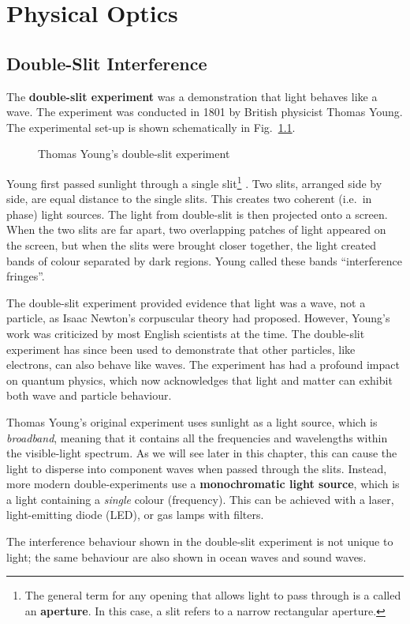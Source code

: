 %
%
\chapter{Physical Optics}
%
%

\section{Double-Slit Interference}

The \textbf{double-slit experiment} was a demonstration that light behaves like
a wave. The experiment was conducted in 1801 by British physicist Thomas Young.
The experimental set-up is shown schematically in
Fig.~\ref{fig:double-slit-setup}.
\begin{figure}[ht]
  \centering
  \caption{Thomas Young's double-slit experiment}
  \label{fig:double-slit-setup}
\end{figure}
Young first passed sunlight through a single slit\footnote{The general term
for any opening that allows light to pass through is a called an
\textbf{aperture}. In this case, a slit refers to a narrow rectangular
aperture.} . Two slits, arranged side by side, are equal distance to the single
slits. This creates two coherent (i.e.\ in phase) light sources. The light from
double-slit is then projected onto a screen. When the two slits are far apart,
two overlapping patches of light appeared on the screen, but when the slits
were brought closer together, the light created bands of colour separated by
dark regions. Young called these bands ``interference fringes''.

The double-slit experiment provided evidence that light was a wave, not a
particle, as Isaac Newton's corpuscular theory had proposed. However, Young's
work was criticized by most English scientists at the time.  The double-slit
experiment has since been used to demonstrate that other particles, like
electrons, can also behave like waves. The experiment has had a profound impact
on quantum physics, which now acknowledges that light and matter can exhibit
both wave and particle behaviour.
\begin{remark}
  Thomas Young's original experiment uses sunlight as a light source, which is
  \emph{broadband}, meaning that it contains all the frequencies and
  wavelengths within the visible-light spectrum. As we will see later in this
  chapter, this can cause the light to disperse into component waves when passed
  through the slits. Instead, more modern double-experiments use a
  \textbf{monochromatic light source}, which is a light containing a
  \emph{single} colour (frequency). This can be achieved with a laser,
  light-emitting diode (LED), or gas lamps with filters.
\end{remark}
The interference behaviour shown in the double-slit experiment is not unique to
light; the same behaviour are also shown in ocean waves and sound waves.

